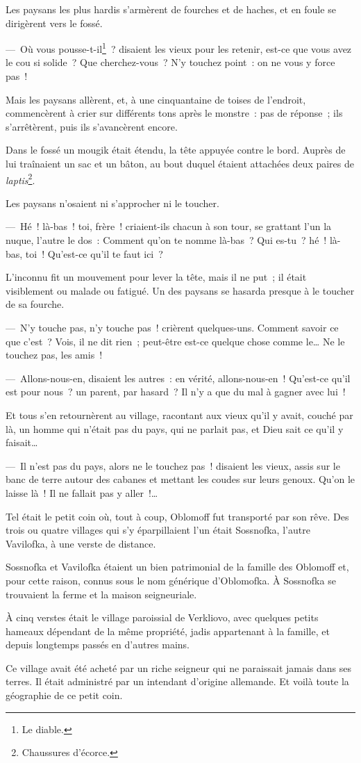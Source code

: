 \documentclass[french,twoside]{book} %
\begin{document}
Les paysans les plus hardis s’armèrent de fourches et de haches, et en foule se dirigèrent vers le fossé.\par
— Où vous pousse-t-il\footnote{Le diable.} ? disaient les vieux pour les retenir, est-ce que vous avez le cou si solide ? Que cherchez-vous ? N’y touchez point : on ne vous y force pas !\par
Mais les paysans allèrent, et, à une cinquantaine de toises de l’endroit, commencèrent à crier sur différents tons après le monstre : pas de réponse ; ils s’arrêtèrent, puis ils s’avancèrent encore.\par
Dans le fossé un mougik était étendu, la tête appuyée contre le bord. Auprès de lui traînaient un sac et un bâton, au bout duquel étaient attachées deux paires de \emph{laptis}\footnote{Chaussures d’écorce.}.\par
Les paysans n’osaient ni s’approcher ni le toucher.\par
— Hé ! là-bas ! toi, frère ! criaient-ils chacun à son tour, se grattant l’un la nuque, l’autre le dos : Comment qu’on te nomme là-bas ? Qui es-tu ? hé ! là-bas, toi ! Qu’est-ce qu’il te faut ici ?\par
L’inconnu fit un mouvement pour lever la tête, mais il ne put ; il était visiblement ou malade ou fatigué. Un des paysans se hasarda presque à le toucher de sa fourche.\par
— N’y touche pas, n’y touche pas ! crièrent quelques-uns. Comment savoir ce que c’est ? Vois, il ne dit rien ; peut-être est-ce quelque chose comme le… Ne le touchez pas, les amis !\par
— Allons-nous-en, disaient les autres : en vérité, allons-nous-en ! Qu’est-ce qu’il est pour nous ? un parent, par hasard ? Il n’y a que du mal à gagner avec lui !\par
Et tous s’en retournèrent au village, racontant aux vieux qu’il y avait, couché par là, un homme qui n’était pas du pays, qui ne parlait pas, et Dieu sait ce qu’il y faisait…\par
— Il n’est pas du pays, alors ne le touchez pas ! disaient les vieux, assis sur le banc de terre autour des cabanes et mettant les coudes sur leurs genoux. Qu’on le laisse là ! Il ne fallait pas y aller !…\par
Tel était le petit coin où, tout à coup, Oblomoff fut transporté par son rêve. Des trois ou quatre villages qui s’y éparpillaient l’un était Sossnofka, l’autre Vavilofka, à une verste de distance.\par
Sossnofka et Vavilofka étaient un bien patrimonial de la famille des Oblomoff et, pour cette raison, connus sous le nom générique d’Oblomofka. À Sossnofka se trouvaient la ferme et la maison seigneuriale.\par
À cinq verstes était le village paroissial de Verkliovo, avec quelques petits hameaux dépendant de la même propriété, jadis appartenant à la famille, et depuis longtemps passés en d’autres mains.\par
Ce village avait été acheté par un riche seigneur qui ne paraissait jamais dans ses terres. Il était administré par un intendant d’origine allemande. Et voilà toute la géographie de ce petit coin.
\end{document}

